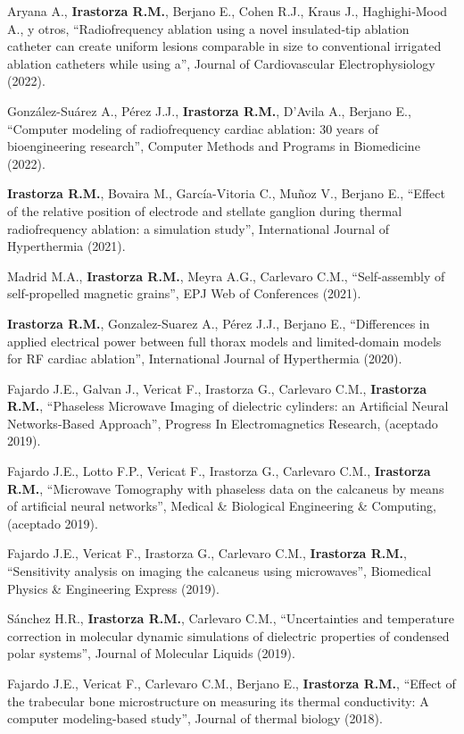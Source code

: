 \documentclass[margin,line]{res}
\begin{document}
\begin{resume}
Aryana A., \textbf{Irastorza R.M.}, Berjano E., Cohen R.J., Kraus J., Haghighi‐Mood A., y otros, ``Radiofrequency ablation using a novel insulated‐tip ablation catheter can create uniform lesions comparable in size to conventional irrigated ablation catheters while using a'', Journal of Cardiovascular Electrophysiology (2022).

González-Suárez A., Pérez J.J., \textbf{Irastorza R.M.}, D'Avila A., Berjano E., ``Computer modeling of radiofrequency cardiac ablation: 30 years of bioengineering research'', Computer Methods and Programs in Biomedicine (2022).

\textbf{Irastorza R.M.}, Bovaira M., García-Vitoria C., Muñoz V., Berjano E., ``Effect of the relative position of electrode and stellate ganglion during thermal radiofrequency ablation: a simulation study'', International Journal of Hyperthermia (2021).

Madrid M.A., \textbf{Irastorza R.M.}, Meyra A.G., Carlevaro C.M., ``Self-assembly of self-propelled magnetic grains'', EPJ Web of Conferences (2021).

\textbf{Irastorza R.M.}, Gonzalez-Suarez A., Pérez J.J., Berjano E., ``Differences in applied electrical power between full thorax models and limited-domain models for RF cardiac ablation'', International Journal of Hyperthermia (2020).

Fajardo J.E., Galvan J., Vericat F., Irastorza G., Carlevaro C.M., \textbf{Irastorza R.M.}, ``Phaseless Microwave Imaging of dielectric cylinders: an Artificial Neural Networks-Based Approach'', Progress In Electromagnetics Research, (aceptado 2019). 

Fajardo J.E., Lotto F.P., Vericat F., Irastorza G., Carlevaro C.M., \textbf{Irastorza R.M.}, ``Microwave Tomography with phaseless data on the calcaneus by means of artificial neural networks'', Medical \& Biological Engineering \& Computing, (aceptado 2019).

Fajardo J.E., Vericat F., Irastorza G., Carlevaro C.M., \textbf{Irastorza R.M.}, ``Sensitivity analysis on imaging the calcaneus using microwaves'', Biomedical Physics \& Engineering Express (2019).

Sánchez H.R., {\bf Irastorza R.M.}, Carlevaro C.M., ``Uncertainties and temperature correction in molecular dynamic simulations of dielectric properties of condensed polar systems'', Journal of Molecular Liquids (2019).

Fajardo J.E., Vericat F., Carlevaro C.M., Berjano E., \textbf{Irastorza R.M.}, ``Effect of the trabecular bone microstructure on measuring its thermal conductivity: A computer modeling-based study'', Journal of thermal biology (2018).


\end{resume}
\end{document}
